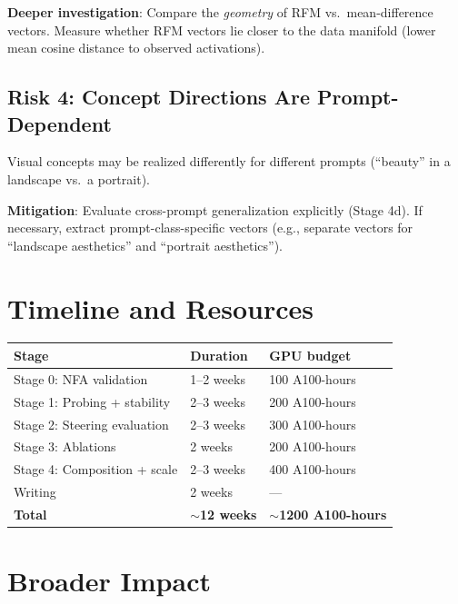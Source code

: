 \documentclass[11pt]{article}
\begin{document}
\textbf{Deeper investigation}: Compare the \emph{geometry} of RFM vs.\ mean-difference vectors.
Measure whether RFM vectors lie closer to the data manifold (lower mean cosine distance to observed activations).

\subsection{Risk 4: Concept Directions Are Prompt-Dependent}

Visual concepts may be realized differently for different prompts (``beauty'' in a landscape vs.\ a portrait).

\textbf{Mitigation}: Evaluate cross-prompt generalization explicitly (Stage 4d).
If necessary, extract prompt-class-specific vectors (e.g., separate vectors for ``landscape aesthetics'' and ``portrait aesthetics'').

\section{Timeline and Resources}
\label{sec:timeline}

\begin{table}[h]
\centering
\begin{tabular}{lll}
\toprule
\textbf{Stage} & \textbf{Duration} & \textbf{GPU budget} \\
\midrule
Stage 0: NFA validation & 1--2 weeks & 100 A100-hours \\
Stage 1: Probing + stability & 2--3 weeks & 200 A100-hours \\
Stage 2: Steering evaluation & 2--3 weeks & 300 A100-hours \\
Stage 3: Ablations & 2 weeks & 200 A100-hours \\
Stage 4: Composition + scale & 2--3 weeks & 400 A100-hours \\
Writing & 2 weeks & --- \\
\midrule
\textbf{Total} & \textbf{$\sim$12 weeks} & \textbf{$\sim$1200 A100-hours} \\
\bottomrule
\end{tabular}
\end{table}

\section{Broader Impact}
\label{sec:impact}
\end{document}

